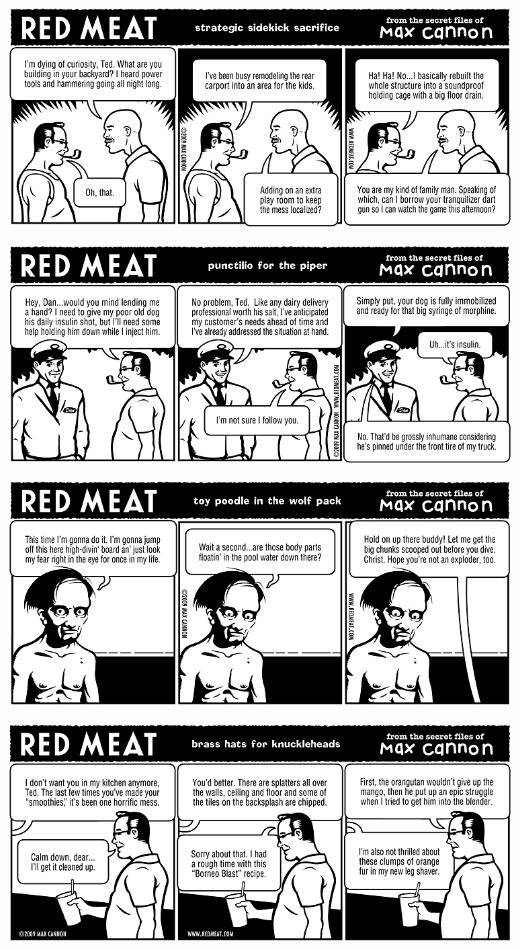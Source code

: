 \documentclass[a4paper,twoside,11pt]{article}
\begin{document}
\includegraphics[width=\textwidth]{redmeat_2009-09-22.png}



\includegraphics[width=\textwidth]{redmeat_2009-09-29.png}



\includegraphics[width=\textwidth]{redmeat_2009-10-06.png}



\includegraphics[width=\textwidth]{redmeat_2009-10-13.png}
\end{document}
